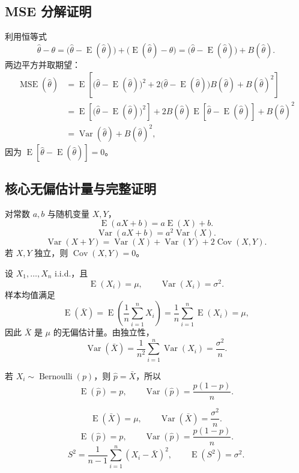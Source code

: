 \documentclass[11pt,a4paper]{article}
\theoremstyle{definition}
\theoremstyle{plain}
\theoremstyle{remark}
\newcommand{\E}{\operatorname{E}}
\newcommand{\Var}{\operatorname{Var}}
\newcommand{\Cov}{\operatorname{Cov}}
\newcommand{\MSE}{\operatorname{MSE}}
\begin{document}
\subsection{MSE 分解证明}

利用恒等式
\[
    \hat\theta-\theta
    =
    \bigl(\hat\theta-\E(\hat\theta)\bigr)
    +
    \bigl(\E(\hat\theta)-\theta\bigr)
    =
    \bigl(\hat\theta-\E(\hat\theta)\bigr)+B(\hat\theta).
\]
两边平方并取期望：
\begin{align}
    \MSE(\hat\theta)
    &= \E\left[
        \bigl(\hat\theta-\E(\hat\theta)\bigr)^2
        +2\bigl(\hat\theta-\E(\hat\theta)\bigr)B(\hat\theta)
        +B(\hat\theta)^2
    \right]\\
    &= \E\left[\bigl(\hat\theta-\E(\hat\theta)\bigr)^2\right]
      +2B(\hat\theta)\E\left[\hat\theta-\E(\hat\theta)\right]
      +B(\hat\theta)^2\\
    &= \Var(\hat\theta)+B(\hat\theta)^2,
\end{align}
因为 $\E[\hat\theta-\E(\hat\theta)]=0$。

\newpage
\subsection{核心无偏估计量与完整证明}

\begin{memorybox}
对常数 $a,b$ 与随机变量 $X,Y$，
\[
    \boxed{\E(aX+b)=a\E(X)+b.}
\]
\[
    \boxed{\Var(aX+b)=a^2\Var(X).}
\]
\[
    \boxed{
    \Var(X+Y)=\Var(X)+\Var(Y)+2\Cov(X,Y).
    }
\]
若 $X,Y$ 独立，则 $\Cov(X,Y)=0$。
\end{memorybox}

设 $X_1,\ldots,X_n$ i.i.d.，且
\[
    \E(X_i)=\mu,\qquad \Var(X_i)=\sigma^2.
\]
样本均值满足
\[
    \E(\bar X)
    =
    \E\left(\frac1n\sum_{i=1}^nX_i\right)
    =
    \frac1n\sum_{i=1}^n\E(X_i)
    =
    \mu,
\]
因此 $\bar X$ 是 $\mu$ 的无偏估计量。由独立性，
\[
    \Var(\bar X)
    =
    \frac{1}{n^2}\sum_{i=1}^n\Var(X_i)
    =
    \frac{\sigma^2}{n}.
\]

若 $X_i\sim\operatorname{Bernoulli}(p)$，则 $\hat p=\bar X$，所以
\[
    \E(\hat p)=p,\qquad
    \Var(\hat p)=\frac{p(1-p)}{n}.
\]

\begin{memorybox}
\[
    \boxed{\E(\bar X)=\mu,\qquad \Var(\bar X)=\frac{\sigma^2}{n}.}
\]
\[
    \boxed{\E(\hat p)=p,\qquad \Var(\hat p)=\frac{p(1-p)}{n}.}
\]
\[
    \boxed{
    S^2=\frac{1}{n-1}\sum_{i=1}^n(X_i-\bar X)^2,
    \qquad
    \E(S^2)=\sigma^2.
    }
\]
\end{memorybox}
\end{document}
